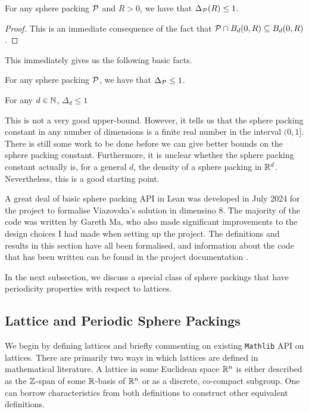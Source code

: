 \begin{boxlemma}
    For any sphere packing $\mathcal{P}$ and $R > 0$, we have that $\Delta_{\mathcal{P}}(R) \leq 1$.
\end{boxlemma}
\begin{proof}
    This is an immediate consequence of the fact that $\mathcal{P} \cap B_d(0, R) \subseteq B_d(0, R)$.
\end{proof}
This immediately gives us the following basic facts.
\begin{boxcorollary}
    For any sphere packing $\mathcal{P}$, we have that $\Delta_{\mathcal{P}} \leq 1$.
\end{boxcorollary}
\begin{boxcorollary}
    For any $d \in \mathbb{N}$, $\Delta_d \leq 1$
\end{boxcorollary}

This is not a very good upper-bound. However, it tells us that the sphere packing constant in any number of dimensions is a finite real number in the interval $(0, 1]$. There is still some work to be done before we can give better bounds on the sphere packing constant. Furthermore, it is unclear whether the sphere packing constant actually is, for a general $d$, the density of a sphere packing in $\mathbb{R}^d$. Nevertheless, this is a good starting point.

A great deal of basic sphere packing API in Lean was developed in July 2024 for the project to formalise Viazovska's solution in dimensino $8$. The majority of the code was written by Gareth Ma, who also made significant improvements to the design choices I had made when setting up the project. The definitions and results in this section have all been formalised, and information about the code that has been written can be found in the project documentation \cite[\texttt{SpherePacking.Basic.SpherePacking}]{documentation}.

In the next subsection, we discuss a special class of sphere packings that have periodicity properties with respect to lattices.

\subsection{Lattice and Periodic Sphere Packings}

We begin by defining lattices and briefly commenting on existing \verb|Mathlib| API on lattices. There are primarily two ways in which lattices are defined in mathematical literature. A lattice in some Euclidean space $\mathbb{R}^n$ is either described as the $\mathbb{Z}$-span of some $\mathbb{R}$-basis of $\mathbb{R}^n$ or as a discrete, co-compact subgroup. One can borrow characteristics from both definitions to construct other equivalent definitions.

